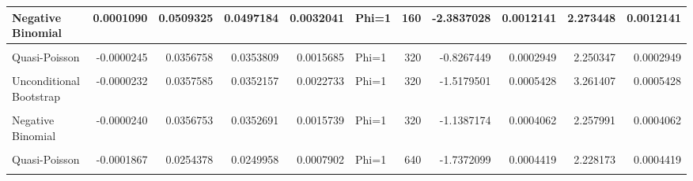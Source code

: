 \documentclass[border=1mm]{standalone}
\begin{document}
\begin{table}
\begin{tabular}{l|r|r|r|r|l|r|r|r|r|r}
\hline
Negative Binomial & 0.0001090 & 0.0509325 & 0.0497184 & 0.0032041 & Phi=1 & 160 & -2.3837028 & 0.0012141 & 2.273448 & 0.0012141\\
\hline
\cellcolor{gray!10}{Poisson} & \cellcolor{gray!10}{-0.0000245} & \cellcolor{gray!10}{0.0356758} & \cellcolor{gray!10}{0.0353965} & \cellcolor{gray!10}{0.0006970} & \cellcolor{gray!10}{Phi=1} & \cellcolor{gray!10}{320} & \cellcolor{gray!10}{-0.7830384} & \cellcolor{gray!10}{0.0002794} & \cellcolor{gray!10}{1.000000} & \cellcolor{gray!10}{0.0002794}\\
\hline
Quasi-Poisson & -0.0000245 & 0.0356758 & 0.0353809 & 0.0015685 & Phi=1 & 320 & -0.8267449 & 0.0002949 & 2.250347 & 0.0002949\\
\hline
\cellcolor{gray!10}{Sandwich} & \cellcolor{gray!10}{-0.0000245} & \cellcolor{gray!10}{0.0356758} & \cellcolor{gray!10}{0.0352190} & \cellcolor{gray!10}{0.0019766} & \cellcolor{gray!10}{Phi=1} & \cellcolor{gray!10}{320} & \cellcolor{gray!10}{-1.2806122} & \cellcolor{gray!10}{0.0004569} & \cellcolor{gray!10}{2.835740} & \cellcolor{gray!10}{0.0004569}\\
\hline
Unconditional Bootstrap & -0.0000232 & 0.0357585 & 0.0352157 & 0.0022733 & Phi=1 & 320 & -1.5179501 & 0.0005428 & 3.261407 & 0.0005428\\
\hline
\cellcolor{gray!10}{Conditional Bootstrap} & \cellcolor{gray!10}{-0.0000456} & \cellcolor{gray!10}{0.0357459} & \cellcolor{gray!10}{0.0352157} & \cellcolor{gray!10}{0.0022733} & \cellcolor{gray!10}{Phi=1} & \cellcolor{gray!10}{320} & \cellcolor{gray!10}{-1.4830906} & \cellcolor{gray!10}{0.0005301} & \cellcolor{gray!10}{3.261407} & \cellcolor{gray!10}{0.0005301}\\
\hline
Negative Binomial & -0.0000240 & 0.0356753 & 0.0352691 & 0.0015739 & Phi=1 & 320 & -1.1387174 & 0.0004062 & 2.257991 & 0.0004062\\
\hline
\cellcolor{gray!10}{Poisson} & \cellcolor{gray!10}{-0.0001867} & \cellcolor{gray!10}{0.0254378} & \cellcolor{gray!10}{0.0250178} & \cellcolor{gray!10}{0.0003546} & \cellcolor{gray!10}{Phi=1} & \cellcolor{gray!10}{640} & \cellcolor{gray!10}{-1.6508600} & \cellcolor{gray!10}{0.0004199} & \cellcolor{gray!10}{1.000000} & \cellcolor{gray!10}{0.0004199}\\
\hline
Quasi-Poisson & -0.0001867 & 0.0254378 & 0.0249958 & 0.0007902 & Phi=1 & 640 & -1.7372099 & 0.0004419 & 2.228173 & 0.0004419\\
\hline
\cellcolor{gray!10}{Sandwich} & \cellcolor{gray!10}{-0.0001867} & \cellcolor{gray!10}{0.0254378} & \cellcolor{gray!10}{0.0249337} & \cellcolor{gray!10}{0.0009954} & \cellcolor{gray!10}{Phi=1} & \cellcolor{gray!10}{640} & \cellcolor{gray!10}{-1.9814001} & \cellcolor{gray!10}{0.0005040} & \cellcolor{gray!10}{2.807017} & \cellcolor{gray!10}{0.0005040}\\

\end{tabular}
\end{table}
\end{document}
